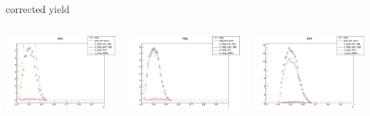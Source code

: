 \begin{frame}{corrected yield}
\begin{columns}
\begin{column}[T]{0.25\textwidth}
\includegraphics[width = \textwidth]{results/yield/statistics_corr/yield_x_Q2_z_0.55_4.764_0.40_pos.png}
\end{column}
\begin{column}[T]{0.25\textwidth}
\includegraphics[width = \textwidth]{results/yield/statistics_corr/yield_x_Q2_z_0.55_4.764_0.40_neg.png}
\end{column}
\begin{column}[T]{0.25\textwidth}
\includegraphics[width = \textwidth]{results/yield/statistics_corr/yield_x_Q2_z_0.55_4.764_0.50_pos.png}

\end{column}
\end{columns}
\end{frame}
